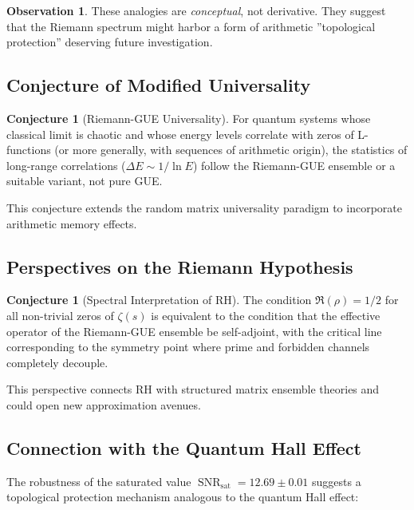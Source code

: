 \documentclass[12pt, a4paper]{article}
\theoremstyle{plain}
\theoremstyle{definition}
\newtheorem{observacion}[teorema]{Observation}
\newtheorem{conjetura}[teorema]{Conjecture}
\theoremstyle{remark}
\newcommand{\SNR}{\operatorname{SNR}}
\begin{document}
\begin{observacion}
These analogies are \textit{conceptual}, not derivative. They suggest that the Riemann spectrum might harbor a form of arithmetic ''topological protection'' deserving future investigation.
\end{observacion}

\subsection{Conjecture of Modified Universality}
\label{subsec:universalidad_modificada}

\begin{conjetura}[Riemann-GUE Universality]
For quantum systems whose classical limit is chaotic and whose energy levels correlate with zeros of L-functions (or more generally, with sequences of arithmetic origin), the statistics of long-range correlations ($\Delta E \sim 1/\ln E$) follow the Riemann-GUE ensemble or a suitable variant, not pure GUE.
\end{conjetura}

This conjecture extends the random matrix universality paradigm to incorporate arithmetic memory effects.

\subsection{Perspectives on the Riemann Hypothesis}
\label{subsec:perspectivas_hr}

\begin{conjetura}[Spectral Interpretation of RH]
The condition $\Re(\rho)=1/2$ for all non-trivial zeros of $\zeta(s)$ is equivalent to the condition that the effective operator of the Riemann-GUE ensemble be self-adjoint, with the critical line corresponding to the symmetry point where prime and forbidden channels completely decouple.
\end{conjetura}

This perspective connects RH with structured matrix ensemble theories and could open new approximation avenues.

\subsection{Connection with the Quantum Hall Effect}
\label{subsec:quantum_hall}

The robustness of the saturated value $\SNR_{\text{sat}} = 12.69 \pm 0.01$ suggests 
a topological protection mechanism analogous to the quantum Hall effect:
\end{document}
